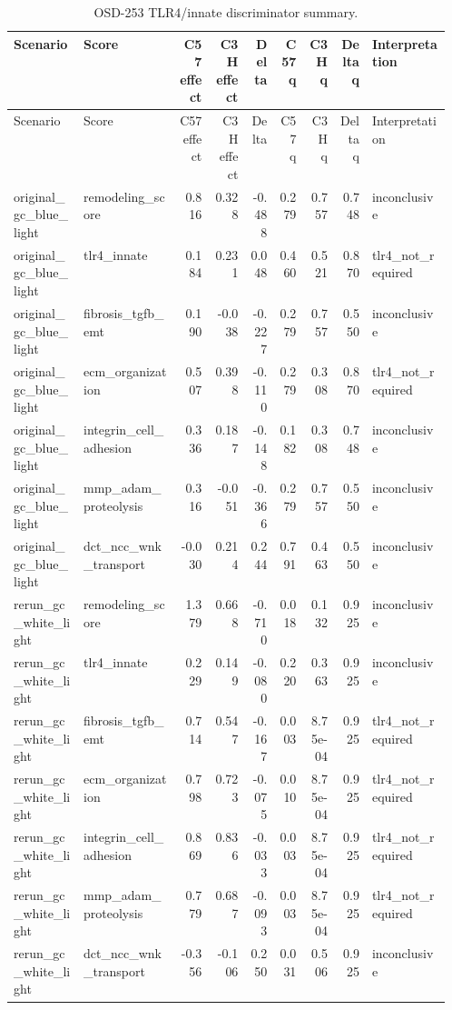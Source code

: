 \documentclass[11pt]{article}
\begin{document}
\begin{landscape}
\scriptsize
\setlength{\tabcolsep}{3pt}
\begin{longtable}{p{0.16\linewidth}p{0.22\linewidth}rrrrrrp{0.18\linewidth}}
\caption{OSD-253 TLR4/innate discriminator summary.}\\
\toprule
Scenario & Score & C57 effect & C3H effect & Delta & C57 q & C3H q & Delta q & Interpretation \\
\midrule
\endfirsthead
\toprule
Scenario & Score & C57 effect & C3H effect & Delta & C57 q & C3H q & Delta q & Interpretation \\
\midrule
\endhead
original\_gc\_blue\_light & remodeling\_score & 0.816 & 0.328 & -0.488 & 0.279 & 0.757 & 0.748 & inconclusive \\
original\_gc\_blue\_light & tlr4\_innate & 0.184 & 0.231 & 0.048 & 0.460 & 0.521 & 0.870 & tlr4\_not\_required \\
original\_gc\_blue\_light & fibrosis\_tgfb\_emt & 0.190 & -0.038 & -0.227 & 0.279 & 0.757 & 0.550 & inconclusive \\
original\_gc\_blue\_light & ecm\_organization & 0.507 & 0.398 & -0.110 & 0.279 & 0.308 & 0.870 & tlr4\_not\_required \\
original\_gc\_blue\_light & integrin\_cell\_adhesion & 0.336 & 0.187 & -0.148 & 0.182 & 0.308 & 0.748 & inconclusive \\
original\_gc\_blue\_light & mmp\_adam\_proteolysis & 0.316 & -0.051 & -0.366 & 0.279 & 0.757 & 0.550 & inconclusive \\
original\_gc\_blue\_light & dct\_ncc\_wnk\_transport & -0.030 & 0.214 & 0.244 & 0.791 & 0.463 & 0.550 & inconclusive \\
rerun\_gc\_white\_light & remodeling\_score & 1.379 & 0.668 & -0.710 & 0.018 & 0.132 & 0.925 & inconclusive \\
rerun\_gc\_white\_light & tlr4\_innate & 0.229 & 0.149 & -0.080 & 0.220 & 0.363 & 0.925 & inconclusive \\
rerun\_gc\_white\_light & fibrosis\_tgfb\_emt & 0.714 & 0.547 & -0.167 & 0.003 & 8.75e-04 & 0.925 & tlr4\_not\_required \\
rerun\_gc\_white\_light & ecm\_organization & 0.798 & 0.723 & -0.075 & 0.010 & 8.75e-04 & 0.925 & tlr4\_not\_required \\
rerun\_gc\_white\_light & integrin\_cell\_adhesion & 0.869 & 0.836 & -0.033 & 0.003 & 8.75e-04 & 0.925 & tlr4\_not\_required \\
rerun\_gc\_white\_light & mmp\_adam\_proteolysis & 0.779 & 0.687 & -0.093 & 0.003 & 8.75e-04 & 0.925 & tlr4\_not\_required \\
rerun\_gc\_white\_light & dct\_ncc\_wnk\_transport & -0.356 & -0.106 & 0.250 & 0.031 & 0.506 & 0.925 & inconclusive \\
\bottomrule
\end{longtable}
\normalsize
\end{landscape}
\end{document}
